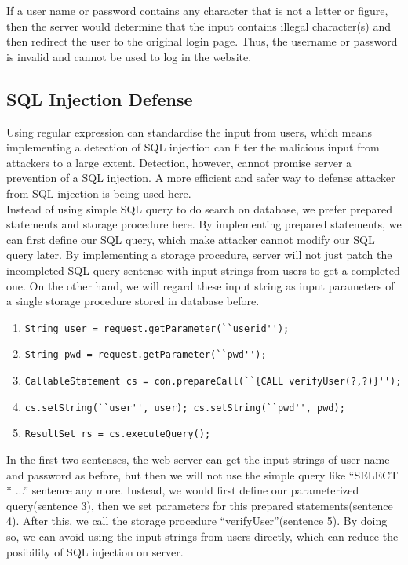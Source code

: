 \documentclass[12pt]{article}
\begin{document}
If a user name or password contains any character that is not a letter or figure, then the server would determine that the input contains illegal character(s) and then redirect the user to the original login page. Thus, the username or password is invalid and cannot be used to log in the website.\\

\subsection{SQL Injection Defense}

Using regular expression can standardise the input from users, which means implementing a detection of SQL injection can filter the malicious input from attackers to a large extent. Detection, however, cannot promise server a prevention of a SQL injection. A more efficient and safer way to defense attacker from SQL injection is being used here.\\

Instead of using simple SQL query to do search on database, we prefer prepared statements and storage procedure here. By implementing prepared statements, we can first define our SQL query, which make attacker cannot modify our SQL query later. By implementing a storage procedure, server will not just patch the incompleted SQL query sentense with input strings from users to get a completed one. On the other hand, we will regard these input string as input parameters of a single storage procedure stored in database before. \\

\begin{enumerate}
\item \verb"String user = request.getParameter(``userid'');" 
\item \verb"String pwd = request.getParameter(``pwd'');"
\item \verb"CallableStatement cs = con.prepareCall(``{CALL verifyUser(?,?)}'');"
\item \verb"cs.setString(``user'', user); cs.setString(``pwd'', pwd);"
\item \verb"ResultSet rs = cs.executeQuery();"	
\end{enumerate}

In the first two sentenses, the web server can get the input strings of user name and password as before, but then we will not use the simple query like ``SELECT * ...'' sentence any more. Instead, we would first define our parameterized query(sentence 3), then we set parameters for this prepared statements(sentence 4). After this, we call the storage procedure ``verifyUser''(sentence 5). By doing so, we can avoid using the input strings from users directly, which can reduce the posibility of SQL injection on server.\\
\end{document}
